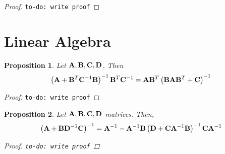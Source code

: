 \documentclass[11pt]{article}
\numberwithin{equation}{section}
\newtheorem{proposition}{Proposition}[section]
\begin{document}
\begin{proof}
	\texttt{to-do: write proof}
\end{proof}

\section{Linear Algebra}

\begin{proposition} \label{prop:matrix-rewrite1}
	Let ${\bf A}, {\bf B}, {\bf C}, {\bf D}$. Then
	\begin{equation}
		\left({\bf A} + {\bf B}^T {\bf C}^{-1} {\bf B}\right)^{-1}{\bf B}^T {\bf C}^{-1} = {\bf A}{\bf B}^T\left({\bf B}{\bf A}{\bf B}^T + {\bf C}\right)^{-1}
	\end{equation}
\end{proposition}

\begin{proof}
	\texttt{to-do: write proof}
\end{proof}

\begin{proposition} \label{prop:woodbury-identity}
	Let ${\bf A}, {\bf B}, {\bf C}, {\bf D}$ matrices. Then,
	\begin{equation}
		\left({\bf A} + {\bf B} {\bf D}^{-1}{\bf C}\right)^{-1} = {\bf A}^{-1} - {\bf A}^{-1}{\bf B}\left({\bf D} + {\bf C}{\bf A}^{-1}{\bf B}\right)^{-1}{\bf C}{\bf A}^{-1}
	\end{equation}
	\begin{proof}
		\texttt{to-do: write proof}
	\end{proof}
\end{proposition}


\end{document}
